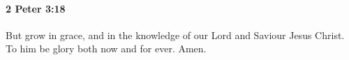 		\paragraph{2 Peter 3:18} %
			\label{2PETER-3-18}

			But grow in grace, and in the knowledge of our Lord and Saviour Jesus Christ.  To him be glory both now and for ever.  Amen.

			\begin{framed}
			\scriptsize
				\begin{compactdesc}
					\item[SBLG] 
				\end{compactdesc}
			\end{framed}